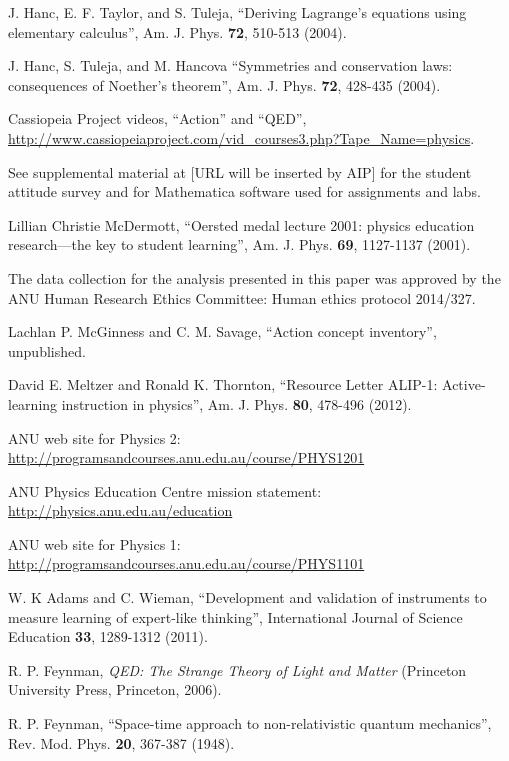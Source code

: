 \documentclass[prb,oncolumn,12pt]{revtex4-2}
\begin{document}
\begin{thebibliography}{99}
 J. Hanc, E. F. Taylor, and S. Tuleja, ``Deriving Lagrange's equations using elementary calculus'', Am. J. Phys. \textbf{72}, 510-513 (2004).

 J. Hanc, S. Tuleja, and M. Hancova ``Symmetries and conservation laws: consequences of Noether's theorem'', Am. J. Phys. \textbf{72}, 428-435 (2004).

 Cassiopeia Project videos, ``Action'' and ``QED'',  \url{http://www.cassiopeiaproject.com/vid_courses3.php?Tape_Name=physics}.

 See supplemental material at [URL will be inserted by AIP] for the student attitude survey and for Mathematica software used for assignments and labs.

 Lillian Christie McDermott, ``Oersted medal lecture 2001: physics education research---the key to student learning'', Am. J. Phys. \textbf{69}, 1127-1137 (2001).

 The data collection for the analysis presented in this paper was approved by the ANU Human Research Ethics Committee: Human ethics protocol 2014/327.

 Lachlan P. McGinness and C. M. Savage, ``Action concept inventory'', unpublished.

 David E. Meltzer and Ronald K. Thornton, ``Resource Letter ALIP-1: Active-learning instruction in physics'', Am. J. Phys. \textbf{80}, 478-496 (2012).

 ANU web site for Physics 2: \url{http://programsandcourses.anu.edu.au/course/PHYS1201}

 ANU Physics Education Centre mission statement: \url{http://physics.anu.edu.au/education}

 ANU web site for Physics 1: \url{http://programsandcourses.anu.edu.au/course/PHYS1101}

  W. K Adams and C. Wieman, ``Development and validation of instruments to measure learning of expert-like thinking'', International Journal of Science Education \textbf{33}, 1289-1312 (2011).

 R. P. Feynman, \textit{QED: The Strange Theory of Light and Matter} (Princeton University Press, Princeton, 2006).

 R. P. Feynman, ``Space-time approach to non-relativistic quantum mechanics'', Rev. Mod. Phys. \textbf{20}, 367-387 (1948).


\end{thebibliography}
\end{document}
